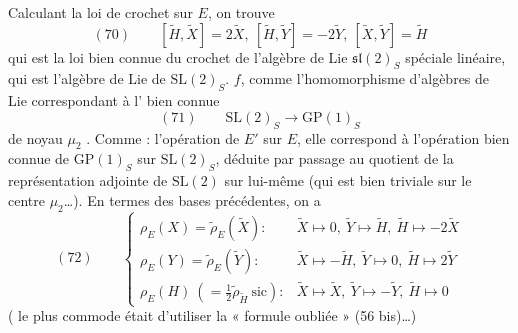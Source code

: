 \documentclass[11pt,a4paper]{article}
\begin{document}
Calculant la loi de crochet sur $E$, on trouve
\[
  (70) \qquad [\tilde{H}, \tilde{X}] = 2\tilde{X} ,\ [\tilde{H}, \tilde{Y}] = -2\tilde{Y} ,\ [\tilde{X}, \tilde{Y}] = \tilde{H}
\]
qui est la loi bien connue du crochet de l'algèbre de Lie $\mathfrak{sl}(2)_S$
spéciale linéaire, qui est l'algèbre de Lie de $\mathrm{SL}(2)_S$.
 $f$, \ill{} comme l'homomorphisme d'algèbres de Lie
correspondant à l'  bien connue
\[
  (71) \qquad \mathrm{SL}(2)_S \longrightarrow \mathrm{GP}(1)_S
\]
 de noyau $\mu_2$ .
Comme : l'opération de $E'$ sur $E$, elle correspond à l'opération bien connue de
$\mathrm{GP}(1)_S$ sur $\mathrm{SL}(2)_S$, déduite par passage au quotient de la
représentation adjointe de $\mathrm{SL}(2)$ sur lui-même (qui est bien triviale
sur le centre $\mu_2$\ldots). En termes des bases précédentes, on a
\[
  (72) \qquad
  \begin{cases}
    \rho_E(X) = \tilde{\rho}_E(\tilde{X}) : & \tilde{X} \mapsto 0 ,\ \tilde{Y} \mapsto \tilde{H} ,\ \tilde{H} \mapsto -2\tilde{X} \\
    \rho_E(Y) = \tilde{\rho}_E(\tilde{Y}) : & \tilde{X} \mapsto -\tilde{H} ,\ \tilde{Y} \mapsto 0 ,\ \tilde{H} \mapsto 2\tilde{Y} \\
    \rho_E(H)\ (= \tfrac{1}{2}\tilde{\rho}_{\tilde{H}}\ \text{sic}) : & \tilde{X} \mapsto \tilde{X} ,\ \tilde{Y} \mapsto -\tilde{Y} ,\ \tilde{H} \mapsto 0
  \end{cases}
\]
( le plus commode était d'utiliser la « formule oubliée »
(56 bis)\ldots)
\end{document}
